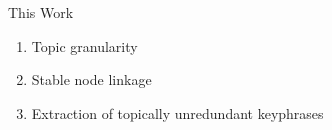   \begin{frame}{This Work}
    \begin{enumerate}
      \item{Topic granularity}
      \item{Stable node linkage}
      \item{Extraction of topically unredundant keyphrases}
    \end{enumerate}
  \end{frame}

